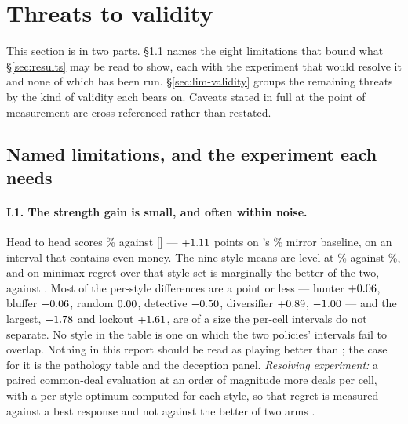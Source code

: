 \section{Threats to validity}
\label{sec:limitations}

This section is in two parts. \S\ref{sec:lim-named} names the eight limitations
that bound what \S\ref{sec:results} may be read to show, each with the experiment
that would resolve it and none of which has been run. \S\ref{sec:lim-validity}
groups the remaining threats by the kind of validity each bears on. Caveats
stated in full at the point of measurement are cross-referenced rather than
restated.

\subsection{Named limitations, and the experiment each needs}
\label{sec:lim-named}

\paragraph{L1. The strength gain is small, and often within noise.}
Head to head \vfive{} scores \numPanelVfiveVfour\% against \vfour{}
[\numStyleCIVfour] --- $+1.11$ points on \vfour{}'s
\numPanelVfourVfour\% mirror baseline, on an interval that contains even money.
The nine-style means are level at \numVfiveMean\% against
\numVfourMean\%, and on minimax regret over that style set \vfour{} is
marginally the better of the two, \numVfourRegret{} against \numVfiveRegret{}.
Most of the per-style differences are a point or
less --- hunter $+0.06$, bluffer $-0.06$, random
$0.00$, detective $-0.50$, diversifier
$+0.89$, \vthree{} $-1.00$ --- and the largest,
\vtwo{} $-1.78$ and lockout $+1.61$, are of a size the
per-cell intervals do not separate. No style in the table is one on which the
two policies' intervals fail to overlap. Nothing in this report should be read as
\vfive{} playing better than \vfour{}; the case for it is the pathology table
and the deception panel. \emph{Resolving experiment:} a paired common-deal
evaluation at an order of magnitude more deals per cell, with a per-style
optimum computed for each style, so that regret is measured against a best
response and not against the better of two arms \cite{xu-mirror}.

